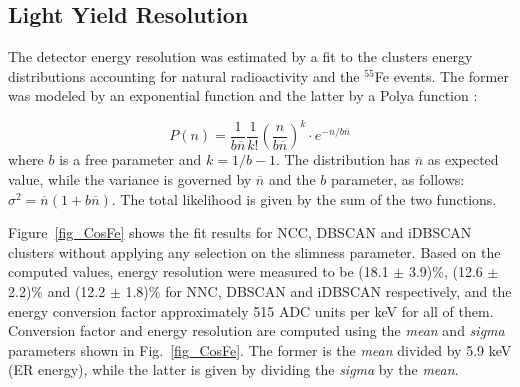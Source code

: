 \documentclass[a4paper,11pt]{article}
\begin{document}


\subsection{Light Yield Resolution}\label{subsec:detres}



The detector energy resolution was estimated by a fit to the clusters energy distributions accounting for natural radioactivity and the $^{55}$Fe events. The former was modeled by an exponential function and the latter by a Polya function \cite{bib:rolandiblum}:

\begin{equation}
   P(n)=\frac{1}{b\overline{n}}\frac{1}{k!}\left(\frac{n}{b\overline{n}}\right)^k \cdot e^{-n/b\overline{n}}
\label{fun:polya}
\end{equation}
where $b$ is a free parameter and $k=1/b-1$. The distribution has $\overline{n}$ as expected value, while the variance is governed by $\overline{n}$ and the $b$ parameter, as follows: $\sigma^2=\overline{n}(1+b\overline{n})$. The total likelihood is given by the sum of the two functions.



Figure~\ref{fig_CosFe} shows the fit results for NCC, DBSCAN and iDBSCAN clusters without applying any selection on the slimness parameter.
Based on the computed values, energy resolution were measured to be (18.1 $\pm$ 3.9)\%, (12.6 $\pm$ 2.2)\% and (12.2 $\pm$ 1.8)\% for NNC, DBSCAN and iDBSCAN respectively, and the energy conversion factor approximately 515 ADC units per keV for all of them.
Conversion factor and energy resolution are computed using the \textit{mean} and \textit{sigma} parameters shown in Fig.~\ref{fig_CosFe}. 
The former is the \textit{mean} divided by 5.9 keV (ER energy), while the latter is given by dividing the \textit{sigma} by the \textit{mean}.
%
\end{document}
